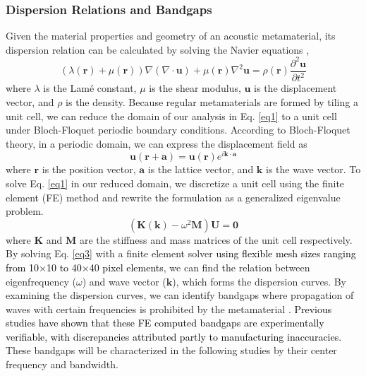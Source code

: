 \documentclass[preprint,review,12pt]{elsarticle}
\newcommand{\rev}[1]{\textcolor{black}{#1}}
\begin{document}
\subsubsection{Dispersion Relations and Bandgaps}
\label{subsubsection:Dispersion Relations and Bandgaps}
Given the material properties and geometry of an acoustic metamaterial, its dispersion relation can be calculated by solving the Navier equations \citep[see][]{zhang2021realization},  
\begin{equation}
    (\lambda (\mathbf{r})+ \mu (\mathbf{r})) \nabla(\nabla \cdot \mathbf{u}) + \mu (\mathbf{r}) \nabla^2 \mathbf{u} = \rho (\mathbf{r}) \frac{\partial^2 \mathbf{u}}{\partial t^2} \label{eq1}
\end{equation} 
where $\lambda$ is the Lamé constant, $\mu$ is the shear modulus, $\mathbf{u}$ is the displacement vector, and $\rho$ is the density. 
Because regular metamaterials are formed by tiling a unit cell, we can reduce the domain of our analysis in Eq. \eqref{eq1} to a unit cell under Bloch-Floquet periodic boundary conditions. According to Bloch-Floquet theory, in a periodic domain, we can express the displacement field as \citep{yang2016effective}
\begin{equation}
    \mathbf{u}(\mathbf{r}+\mathbf{a}) = \mathbf{u}(\mathbf{r})e^{i\mathbf{k} \cdot \mathbf{a}}  \label{eq2}
\end{equation}
where $\mathbf{r}$ is the position vector, $\mathbf{a}$ is the lattice vector, and $\mathbf{k}$ is the wave vector. To solve Eq. \eqref{eq1} in our reduced domain, we discretize a unit cell using the finite element (FE) method and rewrite the formulation as a generalized eigenvalue problem.
\begin{equation}
    (\mathbf{K}(\mathbf{k}) - \omega^2 \mathbf{M})\mathbf{U} = \mathbf{0}  \label{eq3}
\end{equation}
where $\mathbf{K}$ and $\mathbf{M}$ are the stiffness and mass matrices of the unit cell respectively. By solving Eq. \eqref{eq3} with a finite element solver \rev{using flexible mesh sizes ranging from 10$\times$10 to 40$\times$40 pixel elements}, we can find the relation between eigenfrequency ($\omega$) and wave vector ($\mathbf{k}$), which forms the dispersion curves. By examining the dispersion curves, we can identify bandgaps where propagation of waves with certain frequencies is prohibited by the metamaterial \cite{bilal2011ultrawide}. \rev{Previous studies have shown that these FE computed bandgaps are experimentally verifiable, with discrepancies attributed partly to manufacturing inaccuracies. \cite{mazzotti2023bio, Bastawrous2024}} These bandgaps will be characterized in the following studies by their center frequency and bandwidth.
\end{document}
